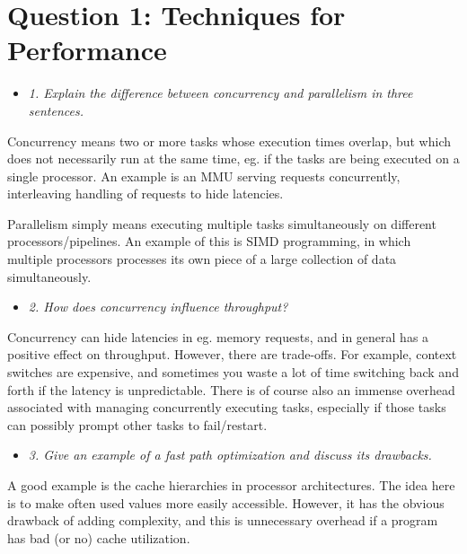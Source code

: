 \newpage
\section{Question 1: Techniques for Performance}


\begin{itemize}
\item \textit{1. Explain the difference between concurrency and parallelism in three sentences.}
\end{itemize}

Concurrency means two or more tasks whose execution times
overlap, but which does not necessarily run at the same time, eg. if the tasks are
being executed on a single processor. An example is an MMU serving requests concurrently,
interleaving handling of requests to hide latencies.

Parallelism simply means executing multiple tasks simultaneously on different processors/pipelines.
An example of this is SIMD programming, in which multiple processors processes its own piece of
a large collection of data simultaneously.

\begin{itemize}
    \item \textit{2. How does concurrency influence throughput?}
\end{itemize}

Concurrency can hide latencies in eg. memory requests, and in general has a
positive effect on throughput. However, there are trade-offs. For example,
context switches are expensive, and sometimes you waste a lot of time switching
back and forth if the latency is unpredictable. There is of course also an
immense overhead associated with managing concurrently executing tasks,
especially if those tasks can possibly prompt other tasks to fail/restart.


\begin{itemize}
  \item \textit{3. Give an example of a fast path optimization and discuss its
    drawbacks.}
\end{itemize}

A good example is the cache hierarchies in processor architectures. The idea
here is to make often used values more easily accessible. However, it has the
obvious drawback of adding complexity, and this is unnecessary overhead if a
program has bad (or no) cache utilization.

\tykstreg
